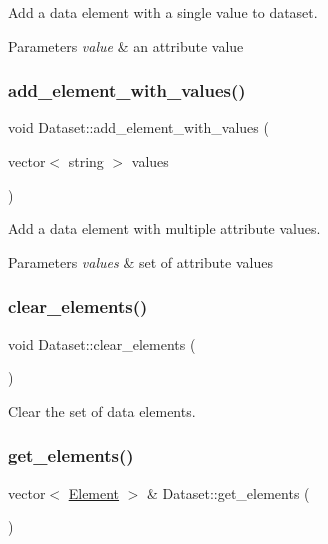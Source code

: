 Add a data element with a single value to dataset. 
\begin{DoxyParams}{Parameters}
{\em value} & an attribute value \\
\hline
\end{DoxyParams}
\mbox{\label{classDataset_af945e29692f141411302850b29d55bfa}} 
\subsubsection{\texorpdfstring{add\+\_\+element\+\_\+with\+\_\+values()}{add\_element\_with\_values()}}
{\footnotesize\ttfamily void Dataset\+::add\+\_\+element\+\_\+with\+\_\+values (\begin{DoxyParamCaption}\item[{vector$<$ string $>$}]{values }\end{DoxyParamCaption})}

Add a data element with multiple attribute values. 
\begin{DoxyParams}{Parameters}
{\em values} & set of attribute values \\
\hline
\end{DoxyParams}
\mbox{\label{classDataset_ac39864fdc124fe2893a42bbbd4a7ecc2}} 
\subsubsection{\texorpdfstring{clear\+\_\+elements()}{clear\_elements()}}
{\footnotesize\ttfamily void Dataset\+::clear\+\_\+elements (\begin{DoxyParamCaption}{ }\end{DoxyParamCaption})}

Clear the set of data elements. \mbox{\label{classDataset_ad2048268e3dcbbcb8695daaadb00cc65}} 
\subsubsection{\texorpdfstring{get\+\_\+elements()}{get\_elements()}}
{\footnotesize\ttfamily vector$<$ \hyperlink{classElement}{Element} $>$ \& Dataset\+::get\+\_\+elements (\begin{DoxyParamCaption}{ }\end{DoxyParamCaption})}

